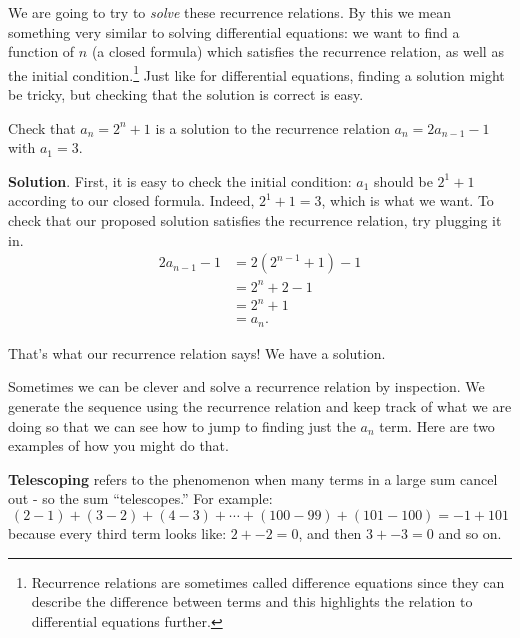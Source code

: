 \documentclass[11pt,]{book}
\newcommand{\terminology}[1]{\textbf{#1}}
\theoremstyle{ptxplainnotitle}
\theoremstyle{ptxplaintitle}
\theoremstyle{ptxdefinitionnotitle}
\theoremstyle{ptxdefinitiontitle}
\theoremstyle{ptxdefinitionnotitle}
\theoremstyle{ptxdefinitiontitle}
\theoremstyle{ptxdefinitionnotitle}
\theoremstyle{ptxdefinitiontitle}
\theoremstyle{ptxdefinitiontitlenonumber}
\theoremstyle{ptxdefinitiontitlenonumber}
\numberwithin{equation}{chapter}
\newcommand{\amp}{&}
\begin{document}
\hypertarget{p-443}{}%
We are going to try to \emph{solve} these recurrence relations. By this we mean something very similar to solving differential equations: we want to find a function of \(n\) (a closed formula) which satisfies the recurrence relation, as well as the initial condition.\footnote{Recurrence relations are sometimes called difference equations since they can describe the difference between terms and this highlights the relation to differential equations further.\label{fn-2}} Just like for differential equations, finding a solution might be tricky, but checking that the solution is correct is easy.%
\begin{example}\label{example-19}
\hypertarget{p-444}{}%
Check that \(a_n = 2^n + 1\) is a solution to the recurrence relation \(a_n = 2a_{n-1} - 1\) with \(a_1 = 3\).%
\par\smallskip%
\noindent\textbf{Solution}.\hypertarget{solution-60}{}\quad%
\hypertarget{p-445}{}%
First, it is easy to check the initial condition: \(a_1\) should be \(2^1 + 1\) according to our closed formula. Indeed, \(2^1 + 1 = 3\), which is what we want. To check that our proposed solution satisfies the recurrence relation, try plugging it in.%
\begin{align*}
2a_{n-1} - 1 \amp = 2(2^{n-1} + 1) - 1 \\
\amp = 2^n + 2 - 1 \\
\amp = 2^n +1\\
\amp = a_n.
\end{align*}
%
\par
\hypertarget{p-446}{}%
That's what our recurrence relation says! We have a solution.%
\end{example}
\hypertarget{p-447}{}%
Sometimes we can be clever and solve a recurrence relation by inspection. We generate the sequence using the recurrence relation and keep track of what we are doing so that we can see how to jump to finding just the \(a_n\) term. Here are two examples of how you might do that.%
\par
\hypertarget{p-448}{}%
\terminology{Telescoping} refers to the phenomenon when many terms in a large sum cancel out - so the sum ``telescopes.'' For example:%
\begin{equation*}
(2 - 1) + (3 - 2) + (4 - 3) + \cdots + (100 - 99) + (101 - 100) = -1 + 101
\end{equation*}
because every third term looks like: \(2 + -2 = 0\), and then \(3 + -3 = 0\) and so on.%
\par
\hypertarget{p-449}{}%
\end{document}
